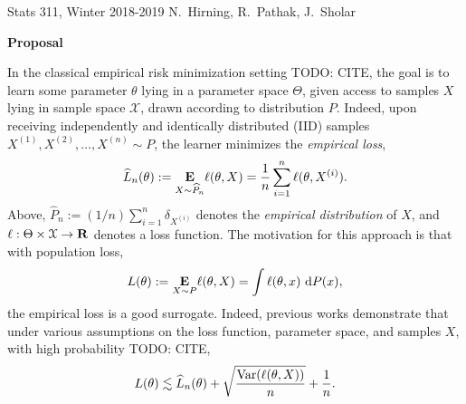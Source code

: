 \documentclass[11pt, reqno, oneside, letterpaper]{article}
\newcommand{\todo}[1]{{\color{red} TODO: {#1}}}
\renewcommand*\d{\mathop{}\!\mathrm{d}}
\let\hat\widehat
\begin{document}
{\parindent 0pt
Stats 311, Winter 2018-2019 \hfill
N.\ Hirning, R.\ Pathak, J.\ Sholar \vskip 0.2in}

\begin{center}
\large{\bf Proposal}
\end{center}

In the classical empirical risk minimization setting \todo{CITE}, the goal is 
to learn some parameter $\theta$ lying in a parameter space $\Theta$, given access to 
samples $X$ lying in sample space $\mathcal{X}$, drawn according to distribution $P$. Indeed, upon receiving independently and identically distributed 
(IID) samples $X^{(1)}, X^{(2)}, \dots, X^{(n)} \sim P$, the learner minimizes the \emph{empirical loss}, 
\[
\widehat L_n(\theta) := \underset{{X \sim \hat P_n}}{\E} \ell(\theta, X) = \frac{1}{n}\sum_{i=1}^n 
\ell(\theta, X^{(i)}). 
\]
Above, $\widehat P_n := (1/n)\sum_{i=1}^n \delta_{X^{(i)}}$ denotes the \emph{empirical
distribution} of $X$, and $\ell: \Theta \times \mathcal{X} \to \mathbf{R}$ denotes a loss 
function. The motivation for this approach is that with population loss,
\[
L(\theta) := \underset{X \sim P}{\E} \ell(\theta, X) = \int \ell(\theta, x) \, \d P(x),
\]
the empirical loss is a good surrogate. Indeed, previous works demonstrate that under various assumptions on the 
loss function, parameter space, and samples $X$, with high probability \todo{CITE}, 
\[
L(\theta) \lesssim \hat L_n(\theta) + \sqrt{\frac{\Var(\ell(\theta, X))}{n}} + \frac{1}{n}.
\]
\end{document}
